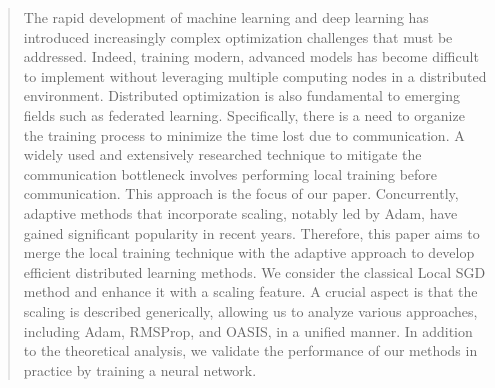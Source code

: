 \documentclass[sn-mathphys,Numbered]{sn-jnl}%
\renewcommand{\|}{\parallel}
\renewcommand {\*} {\ast}
\begin{document}
 
\begin{abstract}{}
The rapid development of machine learning and deep learning has introduced increasingly complex optimization challenges that must be addressed. Indeed, training modern, advanced models has become difficult to implement without leveraging multiple computing nodes in a distributed environment. Distributed optimization is also fundamental to emerging fields such as federated learning. Specifically, there is a need to organize the training process to minimize the time lost due to communication. A widely used and extensively researched technique to mitigate the communication bottleneck involves performing local training before communication. This approach is the focus of our paper. Concurrently, adaptive methods that incorporate scaling, notably led by Adam, have gained significant popularity in recent years. Therefore, this paper aims to merge the local training technique with the adaptive approach to develop efficient distributed learning methods. We consider the classical Local SGD method and enhance it with a scaling feature. A crucial aspect is that the scaling is described generically, allowing us to analyze various approaches, including Adam, RMSProp, and OASIS, in a unified manner. In addition to the theoretical analysis, we validate the performance of our methods in practice by training a neural network.
 

\end{abstract}
\end{document}
